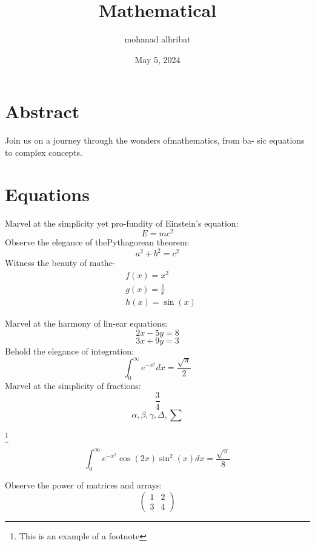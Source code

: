 \documentclass{article}
\title{Mathematical}
\author{mohanad alhribat}
\date{May 5, 2024}
\begin{document}
\begin{multicols}{2}

\maketitle

\section*{Abstract}
Join us on a journey through the wonders ofmathematics, from ba-
sic equations to complex concepts.

\section*{Equations}
Marvel at the simplicity yet pro-fundity of Einstein’s equation:
\[E=mc^2\]
Observe the elegance of thePythagorean theorem:
\[a^2 + b^2 = c^2\]
Witness the beauty of mathe-
\begin{align}
    &f(x)=x^2\\
    &g(x)=\frac{1}{x}\\
    &h(x)=\sin(x)
\end{align}

Marvel at the harmony of lin-ear equations:
\begin{equation*}
2x - 5y = 8
\end{equation*}
\begin{equation*}
3x + 9y = 3
\end{equation*}
  Behold the elegance of integration:
  \begin{equation}
\int_0^{\infty} e^{-x^2}dx=\frac{\sqrt{\pi}}{2}
  \end{equation}
  Marvel at the simplicity of fractions:
  \begin{equation*}
     \frac{3}{4}  
  \end{equation*}
 \begin{equation*}
     \alpha,\beta,\gamma,\Delta,\sum
 \end{equation*}

 \footnote{This is an example of a footnote}
 
\begin{equation}
    \int_0^{\infty} e^{-x^2}\cos(2x)\sin^2(x)dx = \frac{\sqrt{\pi}}{8}
\end{equation}

Observe the power of matrices and arrays:
\begin{equation*}
\left(
    \begin{matrix}
        1 & 2  \\
        3 & 4
    \end{matrix}
    \right)
\end{equation*}


\end{multicols}
\end{document}
